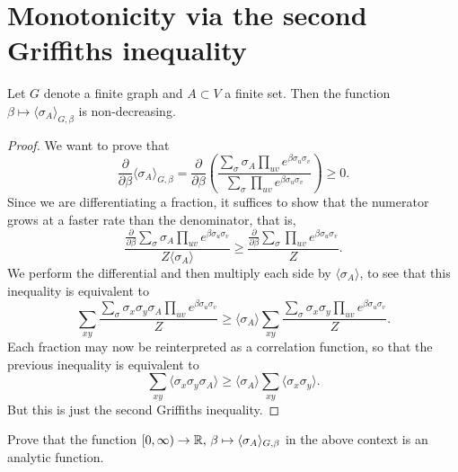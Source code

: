 \section{Monotonicity via the second Griffiths inequality}

\begin{theorem}
    Let $G$ denote a finite graph and $A\subset V$ a finite set.
    Then the function $\beta\mapsto\langle\sigma_A\rangle_{G,\beta}$
    is non-decreasing.
\end{theorem}

\begin{proof}
    We want to prove that
    \[
        \frac{\partial}{\partial\beta}
        \langle\sigma_A\rangle_{G,\beta}
        =
        \frac{\partial}{\partial\beta}
        \left(
            \frac{
                \sum_\sigma\sigma_A\prod_{uv}e^{\beta\sigma_u\sigma_v}
            }{
                \sum_\sigma\prod_{uv}e^{\beta\sigma_u\sigma_v}
            }
        \right)
        \geq 0.
    \]
    Since we are differentiating a fraction,
    it suffices to show that the numerator grows at a faster rate
    than the denominator,
    that is,
    \[
        \frac{\frac{\partial}{\partial\beta}
            \sum_\sigma\sigma_A\prod_{uv}e^{\beta\sigma_u\sigma_v}
        }{
            Z\langle\sigma_A\rangle
        }
        \geq
        \frac{\frac{\partial}{\partial\beta}
            \sum_\sigma\prod_{uv}e^{\beta\sigma_u\sigma_v}
        }{
            Z
        }.
    \]
    We perform the differential and then multiply each side by $\langle\sigma_A\rangle$,
    to see that this inequality is equivalent to
    \[
       \sum_{xy}
        \frac{\sum_\sigma
            \sigma_x\sigma_y\sigma_A\prod_{uv}e^{\beta\sigma_u\sigma_v}
        }{Z}
        \geq
        \langle\sigma_A\rangle
        \sum_{xy}
        \frac{
            \sum_\sigma
            \sigma_x\sigma_y
            \prod_{uv}e^{\beta\sigma_u\sigma_v}
        }{Z}.
    \]
    Each fraction may now be reinterpreted as a correlation function,
    so that the previous inequality is equivalent to
    \[
        \sum_{xy}\langle\sigma_x\sigma_y\sigma_A\rangle
        \geq
        \langle\sigma_A\rangle
        \sum_{xy}\langle\sigma_x\sigma_y\rangle.
    \]
    But this is just the second Griffiths inequality.
\end{proof}

\begin{exercise}
    Prove that the function $[0,\infty)\to\mathbb R,\,\beta\mapsto\langle\sigma_A\rangle_{G,\beta}$
    in the above context is an analytic function.
\end{exercise}

